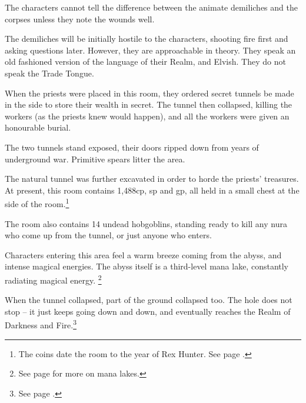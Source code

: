 \begin{multicols}{2}

The characters cannot tell the difference between the animate demiliches and the corpses unless they note the wounds well.

The demiliches will be initially hostile to the characters, shooting fire first and asking questions later.  However, they are approachable in theory.  They speak an old fashioned version of the language of their Realm, and Elvish.  They do not speak the Trade Tongue.


\begin{exampletext}

When the priests were placed in this room, they ordered secret tunnels be made in the side to store their wealth in secret.
The tunnel then collapsed, killing the workers (as the priests knew would happen), and all the workers were given an honourable burial.

\end{exampletext}

The two tunnels stand exposed, their doors ripped down from years of underground war.  Primitive spears litter the area.


The natural tunnel was further excavated in order to horde the priests' treasures.
At present, this room contains 1,488cp, \thepage sp and  gp, all held in a small chest at the side of the room.\footnote{The coins date the room to the year of Rex Hunter.
See page \pageref{r_hunter}.}

The room also contains 14 undead hobgoblins, standing ready to kill any nura who come up from the tunnel, or just anyone who enters.



Characters entering this area feel a warm breeze coming from the abyss, and intense magical energies.
The abyss itself is a third-level mana lake, constantly radiating magical energy.%
\footnote{See page \pageref{mana_lake} for more on mana lakes.}

\begin{exampletext}

When the tunnel collapsed, part of the ground collapsed too.  The hole does not stop -- it just keeps going down and down, and eventually reaches the Realm of Darkness and Fire.\footnote{See page \pageref{darknessandfire}.}


\end{exampletext}
\end{multicols}
